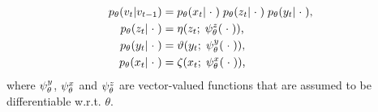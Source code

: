 \begin{align}
\label{eq:general_model_tmc}
    p_{\theta}(v_t|v_{t-1}) &=  p_{\theta}(x_t|\;\cdot\;) \; p_{\theta}(z_t|\;\cdot\;) \; p_{\theta}(y_t|\;\cdot\;) \text{,}\\
\label{eq:pz}
    p_{\theta}(z_t | \;\cdot\;) &= \eta(z_t; \; \psi^{z}_{\theta}(\;\cdot\;) ) \text{,}\\
\label{eq:py}
    p_{\theta}(y_t | \;\cdot\;) &= \vartheta(y_t; \; \psi^{y}_{\theta}(\;\cdot\;)) \text{,}\\
    \label{eq:px}
    p_{\theta}(x_t | \;\cdot\;) &= \zeta(x_t; \; \psi^{x}_{\theta}(\;\cdot\;) ) \text{,}
\end{align}
where  $\psi^{y}_{\theta}$, $\psi^{x}_{\theta}$ and $\psi^{z}_{\theta}$ are 
vector-valued functions that are assumed to be
differentiable w.r.t. $\theta$. 



